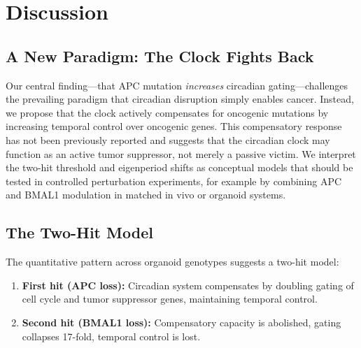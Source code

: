 \documentclass[11pt,letterpaper]{article}
\begin{document}
\section{Discussion}

\subsection{A New Paradigm: The Clock Fights Back}

Our central finding---that APC mutation \textit{increases} circadian gating---challenges the prevailing paradigm that circadian disruption simply enables cancer. Instead, we propose that the clock actively compensates for oncogenic mutations by increasing temporal control over oncogenic genes. This compensatory response has not been previously reported and suggests that the circadian clock may function as an active tumor suppressor, not merely a passive victim. We interpret the two-hit threshold and eigenperiod shifts as conceptual models that should be tested in controlled perturbation experiments, for example by combining APC and BMAL1 modulation in matched in vivo or organoid systems.

\subsection{The Two-Hit Model}

The quantitative pattern across organoid genotypes suggests a two-hit model:

\begin{enumerate}[noitemsep]
    \item \textbf{First hit (APC loss):} Circadian system compensates by doubling gating of cell cycle and tumor suppressor genes, maintaining temporal control.
    \item \textbf{Second hit (BMAL1 loss):} Compensatory capacity is abolished, gating collapses 17-fold, temporal control is lost.
\end{enumerate}
\end{document}
